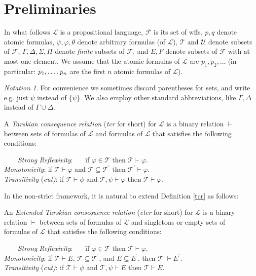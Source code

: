 \documentclass{LMCS}
\theoremstyle{remark}
\newtheorem*{notation}{Notation}
\newcommand{\lp}{\mathcal{L}}
\newcommand{\T}{\mathcal{T}}
\newcommand{\U}{\mathcal{U}}
\newcommand{\F}{\mathcal{F}}
\newcommand{\ptil}{p_1 \til p_n}
\newcommand{\g}{\Gamma}
\newcommand{\de}{\Delta}
\newcommand{\vd}{\vdash}
\newcommand{\fe}{\varphi}
\newcommand{\suq}{\subseteq}
\begin{document}
\section{Preliminaries}

In what follows  $\lp$ is a propositional language,
${\F}$ is its set of wffs,
$p,q$ denote atomic formulas,
$\psi,\fe,\theta$ denote arbitrary formulas  (of $\lp$),
$\T$ and $\U$ denote subsets of ${\F}$,
$\g,\de,\Sigma,\Pi$ denote {\em finite} subsets of ${\F}$,
and $E,F$ denote subsets of ${\F}$ with at most one element.
We assume that the atomic formulas of $\lp$
are $p_1,p_2,\ldots$ (in particular:
$\ptil$ are the first $n$ atomic formulas of $\lp$).

\begin{notation}
For convenience we sometimes discard  parentheses for sets,
and write e.g. just $\psi$ instead of $\{\psi\}$.
We also employ other standard abbreviations, like
$\g,\de$ instead of $\g \cup \de$.
\end{notation}

\begin{defi}
\label{tcr}
A {\em Tarskian consequence relation} ({\em tcr} for short) for $\lp$
is a binary relation $\vd$ between sets of formulas of $\lp$ and formulas of $\lp$
that satisfies the following conditions:
\begin{tabbing}
\ \ \ \ \=
 {\it Strong} {\it Reflexivity}: \ \ \ \=
if $\fe \in \T$ then $\T \vd \fe$.\\
 \> {\it Monotonicity}: \> if $\T \vd \fe$ and
$\T \suq \T^\prime$ then $\T^\prime \vd \fe$. \\
 \> {\it Transitivity} {(\it cut)}:
\> if $\T \vd \psi$ and $\T, \psi \vd \fe$
then $\T \vd \fe$.
\end{tabbing}
\end{defi}

\noindent In the non-strict framework, it is natural to extend Definition \ref{tcr} as follows: 

\begin{defi}
\label{etcr}
An {\em Extended Tarskian consequence relation} ({\em etcr} for short) for $\lp$
is a binary relation $\vd$ between sets of formulas of $\lp$ and singletons or
empty sets of formulas of $\lp$ that satisfies the following conditions:
\begin{tabbing}
\ \ \ \ \=
 {\it Strong} {\it Reflexivity}: \ \ \ \=
if $\fe \in \T$ then $\T \vd \fe$.\\
 \> {\it Monotonicity}: \> if $\T \vd E$, $\T \suq \T^\prime$, and $E\suq E^\prime$, then $\T^\prime \vd E^\prime$. \\
 \> {\it Transitivity} {(\it cut)}:
\> if $\T \vd \psi$ and $\T, \psi \vd E$
then $\T \vd E$.
\end{tabbing}
\end{defi}
\end{document}
